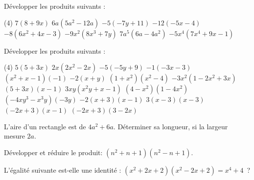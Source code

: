 \documentclass[a4paper,12pt]{report}
\begin{document}
\begin{exo}
Développer les produits suivants :
\begin{tasks}(4)
\task $7(8+9 x)$
\task $6 a\left(5 a^2-12 a\right)$
\task $-5(-7 y+11)$
\task $-12(-5 x-4)$
\task $-8\left(6 x^2+4 x-3\right)$
\task $-9 x^2\left(8 x^3+7 y\right)$
\task $7 a^5\left(6 a-4 a^2\right)$
\task $-5 x^4\left(7 x^4+9 x-1\right)$
\end{tasks}
\end{exo}
\begin{exo}
Développer les produits suivants :
\begin{tasks}(4)
\task $5(5+3 x)$
\task $2 x\left(2 x^2-2 x\right)$
\task $-5(-5 y+9)$
\task $-1(-3 x-3)$
\task $\left(x^2+x-1\right)(-1)$
\task $-2(x+y)$
\task $\left(1+x^2\right)\left(x^2-4\right)$
\task $-3 x^2\left(1-2 x^2+3 x\right)$
\task $(5+3 x)(x-1)$
\task $3 x y\left(x^2 y+x-1\right)$
\task $\left(4-x^2\right)\left(1-4 x^2\right)$
\task $\left(-4 x y^3-x^3 y\right)(-3 y)$
\task $-2(x+3)(x-1)$
\task $3(x-3)(x-3)$
\task $(-2 x+3)(x-1)$
\task $(-2 x+3)(3-2 x)$
\end{tasks}
\end{exo}
\begin{exo}
L'aire d'un rectangle est de $4 a^2+6 a$. Déterminer sa longueur, si la largeur mesure $2 a$.
\end{exo}
\begin{exo}
Développer et réduire le produit: $\left(n^2+n+1\right)\left(n^2-n+1\right)$. 
\begin{comment}
$\left(^*\right)$ Déterminer toutes les valeurs de l'entier naturel $n$, pour lesquelles $n^4+n^2+1$ est un nombre premier.
\end{comment}
\end{exo}
\begin{exo}
L'égalité suivante est-elle une identité : $\left(x^2+2 x+2\right)\left(x^2-2 x+2\right)=x^4+4$~?
\end{exo}
\end{document}
